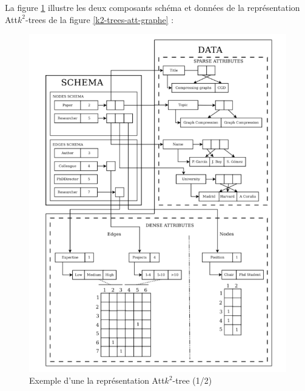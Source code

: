\begin{itemize}
\begin{description}
\end{description}
La figure \ref{k2-trees-att-schema} illustre les deux composants schéma et données de la représentation Att$k^2$-trees  de la figure \ref{k2-trees-att-graphe} \citep{alvarez2018compact}:
\begin{figure}[H]
\begin{center}
\includegraphics[scale=0.7]{./ressources/image/k2-trees-att-schema.png} 
\end{center}
\caption{Exemple d'une la représentation Att$k^2$-tree (1/2)}
\label{k2-trees-att-schema}
\end{figure}



\end{itemize}
